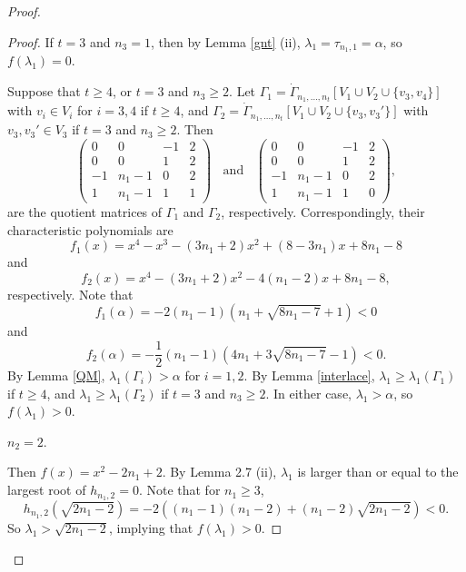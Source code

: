 \documentclass[10pt,a4paper]{amsart}
\numberwithin{equation}{section}
\begin{document}
\begin{proof}
\begin{proof}
If $t=3$ and $n_3=1$, then by Lemma \ref{gnt} (ii), $\lambda_1=\tau_{n_1,1}=\alpha$, so $f(\lambda_1)=0$. 

Suppose that $t\ge 4$, or $t=3$ and $n_3\ge 2$. Let $\Gamma_1=\dot \Gamma_{n_1,\dots, n_t}[V_1\cup V_2\cup \{v_3, v_4\}]$ with $v_i\in V_i$ for $i=3,4$  if $t\ge 4$, and  $\Gamma_2=\dot \Gamma_{n_1,\dots, n_t}[V_1\cup V_2\cup \{v_3, v_3'\}]$ with $v_3, v_3'\in V_3$ if $t=3$ and $n_3\ge 2$. 
Then 
\[
\begin{pmatrix}
0 & 0 & -1 & 2 \\
0 & 0 & 1 & 2 \\
-1 & n_1-1 & 0 & 2 \\
1 & n_1-1 & 1 & 1 
\end{pmatrix}\ \ \ \ 
\text{and} \ \ \ \ 
\begin{pmatrix}
	0 & 0 & -1 & 2 \\
	0 & 0 & 1 & 2 \\
	-1 & n_1-1 & 0 & 2 \\
	1 & n_1-1 & 1 & 0 
\end{pmatrix},
\]
are the quotient matrices of $\Gamma_1$ and $\Gamma_2$, respectively.  Correspondingly, their characteristic polynomials are 
\[
f_1(x)=x^4-x^3-(3n_1+2)x^2+(8-3n_1)x+8n_1-8
\] 
and 
\[
f_2(x)=x^4-(3n_1+2)x^2-4(n_1-2)x+8n_1-8,
\]
respectively. 
Note that 
\[
f_1(\alpha)=-2(n_1-1)\left(n_1+\sqrt{8n_1-7}+1\right)<0
\]
and
\[
f_2(\alpha)=-\frac{1}{2}(n_1-1)\left(4n_1+3\sqrt{8n_1-7}-1\right)<0.
\]
By Lemma \ref{QM}, $\lambda_1(\Gamma_i)>\alpha$ for $i=1, 2$. 
By Lemma \ref{interlace},  $\lambda_1\ge \lambda_1(\Gamma_1)$ if $t\ge 4$, and 
 $\lambda_1\ge \lambda_1(\Gamma_2)$ if $t=3$ and $n_3\ge 2$. In either case,
 $\lambda_1>\alpha$,   so $f(\lambda_1)>0$. 


 $n_2=2$.

Then $f(x)=x^2-2n_1+2$.  By Lemma 2.7 (ii), $\lambda_1$ is larger than or equal to the largest root of 
$h_{n_1,2}=0$.
Note that for $n_1\ge 3$, 
\[
h_{n_1,2}\left(\sqrt{2n_1-2}\right)=-2\left((n_1-1)(n_1-2)+(n_1-2)\sqrt{2n_1-2}\right)<0. 
\]
So  $\lambda_1>\sqrt{2n_1-2}$, implying that $f(\lambda_1)>0$. 


\end{proof}
\end{proof}
\end{document}
